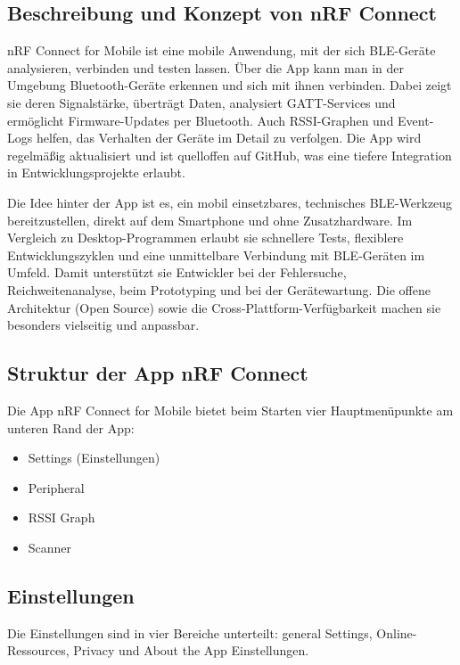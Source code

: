 \subsection{Beschreibung und Konzept von nRF Connect}
nRF Connect for Mobile ist eine mobile Anwendung, mit der sich BLE-Geräte analysieren, verbinden und testen lassen. Über die App kann man in der Umgebung Bluetooth-Geräte erkennen und sich mit ihnen verbinden. Dabei zeigt sie deren Signalstärke, überträgt Daten, analysiert GATT-Services und ermöglicht Firmware-Updates per Bluetooth. Auch RSSI-Graphen und Event-Logs helfen, das Verhalten der Geräte im Detail zu verfolgen. Die App wird regelmäßig aktualisiert und ist quelloffen auf GitHub, was eine tiefere Integration in Entwicklungsprojekte erlaubt. \cite{NordicApplications:2025}
\cite{NordicBluetooth:2025}

\vspace{1\baselineskip}

Die Idee hinter der App ist es, ein mobil einsetzbares, technisches BLE-Werkzeug bereitzustellen, direkt auf dem Smartphone und ohne Zusatzhardware. Im Vergleich zu Desktop-Programmen erlaubt sie schnellere Tests, flexiblere Entwicklungszyklen und eine unmittelbare Verbindung mit BLE-Geräten im Umfeld. Damit unterstützt sie Entwickler bei der Fehlersuche, Reichweitenanalyse, beim Prototyping und bei der Gerätewartung. Die offene Architektur (Open Source) sowie die Cross-Plattform-Verfügbarkeit machen sie besonders vielseitig und anpassbar.
\cite{NordicApplications:2025}\cite{NordicBluetooth:2025}

\subsection{Struktur der App nRF Connect}

Die App nRF Connect for Mobile bietet beim Starten vier Hauptmenüpunkte am unteren Rand der App:

\begin{itemize}
    \item Settings (Einstellungen)
    \item Peripheral
    \item RSSI Graph
    \item Scanner
\end{itemize}

\subsection{Einstellungen}
Die Einstellungen sind in vier Bereiche unterteilt: general Settings, Online-Ressources, Privacy und About the App Einstellungen.

